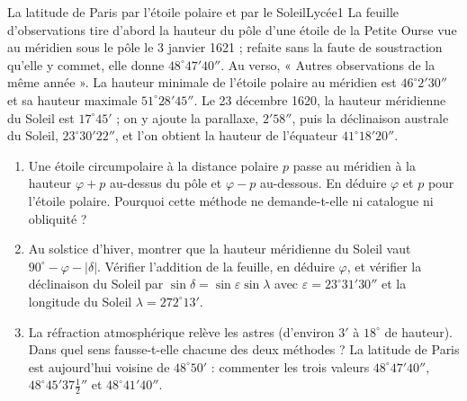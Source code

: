 \documentclass[11pt,a4paper]{article}
\begin{document}
\begin{exercice}{La latitude de Paris par l'étoile polaire et par le Soleil}{Lycée}{1}
La feuille d'observations tire d'abord la hauteur du pôle d'une étoile de la Petite
Ourse vue au méridien sous le pôle le 3 janvier 1621 ; refaite sans la faute de
soustraction qu'elle y commet, elle donne $48^\circ 47' 40''$. Au verso, « Autres
observations de la même année ». La hauteur minimale de
l'étoile polaire au méridien est $46^\circ 2' 30''$ et sa hauteur maximale
$51^\circ 28' 45''$. Le 23 décembre 1620, la hauteur méridienne du Soleil est
$17^\circ 45'$ ; on y ajoute la parallaxe, $2' 58''$, puis la déclinaison australe du
Soleil, $23^\circ 30' 22''$, et l'on obtient la hauteur de l'équateur
$41^\circ 18' 20''$.


\begin{enumerate}
\item Une étoile circumpolaire à la distance polaire $p$ passe au méridien à la
  hauteur $\varphi + p$ au-dessus du pôle et $\varphi - p$ au-dessous. En déduire
  $\varphi$ et $p$ pour l'étoile polaire. Pourquoi cette méthode ne demande-t-elle
  ni catalogue ni obliquité ?
\item Au solstice d'hiver, montrer que la hauteur méridienne du Soleil vaut
  $90^\circ - \varphi - |\delta|$. Vérifier l'addition de la feuille, en déduire
  $\varphi$, et vérifier la déclinaison du Soleil par $\sin\delta =
  \sin\varepsilon\sin\lambda$ avec $\varepsilon = 23^\circ 31' 30''$ et la longitude
  du Soleil $\lambda = 272^\circ 13'$.
\item La réfraction atmosphérique relève les astres (d'environ $3'$ à $18^\circ$ de
  hauteur). Dans quel sens fausse-t-elle chacune des deux méthodes ? La latitude de
  Paris est aujourd'hui voisine de $48^\circ 50'$ : commenter les trois valeurs
  $48^\circ 47' 40''$, $48^\circ 45' 37\frac12''$ et $48^\circ 41' 40''$.
\end{enumerate}
\end{exercice}
\end{document}
